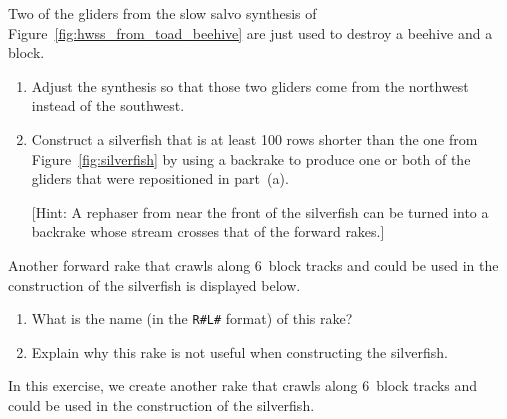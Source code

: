 \begin{multicols}{2}
	\mfilbreak
	
	
	\begin{problem}\label{exer:silverfish_backward_glider_destroy}
		Two of the gliders from the slow salvo synthesis of Figure~\ref{fig:hwss_from_toad_beehive} are just used to destroy a beehive and a block.\smallskip
		
		\begin{enumerate}[label=\bf\color{ocre}(\alph*)]
			\item {} Adjust the synthesis so that those two gliders come from the northwest instead of the southwest.
			
			\item {} Construct a silverfish that is at least 100 rows shorter than the one from Figure~\ref{fig:silverfish} by using a backrake to produce one or both of the gliders that were repositioned in part~(a).
			
			[Hint: A rephaser from near the front of the silverfish can be turned into a backrake whose stream crosses that of the forward rakes.]
		\end{enumerate}
	\end{problem}
	
	
	\mfilbreak
	
	
	\begin{problem}\label{exer:self_support_spaceships_r6l21} 
		Another forward rake that crawls along $6$~block tracks and could be used in the construction of the silverfish is displayed below.
		\begin{center}
		\end{center}
		
		\begin{enumerate}[label=\bf\color{ocre}(\alph*)]
			\item What is the name (in the \texttt{R\#L\#} format) of this rake?
			
			\item Explain why this rake is not useful when constructing the silverfish.
		\end{enumerate}
	\end{problem}
	
	
	\mfilbreak
	
	
	\begin{problemstar}\label{exer:self_support_spaceships_r2l16} 
		In this exercise, we create another rake that crawls along $6$~block tracks and could be used in the construction of the silverfish.\smallskip
		

\end{problemstar}
\end{multicols}
